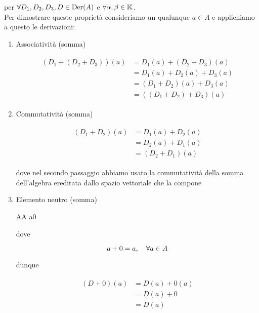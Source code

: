 per $ \forall D_{1}, D_{2}, D_{3}, D \in \operatorname{Der}(A) $ e $ \forall \alpha, \beta \in \mathbb{K} $.\\
Per dimostrare queste proprietà consideriamo un qualunque $ a \in A $ e applichiamo a questo le derivazioni:

\begin{enumerate}
	\item Associatività (somma)
	
	\begin{align}
		\begin{split}
			( D_{1} + (D_{2} + D_{3}) ) (a) &= D_{1} (a) + (D_{2} + D_{3}) (a)\\
			&= D_{1} (a) + D_{2} (a) + D_{3} (a)\\
			&= (D_{1} + D_{2}) (a) + D_{3} (a)\\
			&= ( (D_{1} + D_{2}) + D_{3} ) (a)
		\end{split}
	\end{align}
	
	\item Commutatività (somma)
	
	\begin{align}
		\begin{split}
			(D_{1} + D_{2}) (a) &= D_{1} (a) + D_{2} (a)\\
			&= D_{2} (a) + D_{1} (a)\\
			&= (D_{2} + D_{1}) (a)
		\end{split}
	\end{align}
	
	dove nel secondo passaggio abbiamo usato la commutatività della somma dell'algebra ereditata dallo spazio vettoriale che la compone
	
	\item Elemento neutro (somma)
	
		{A}{A}
		{a}{0}
	
	dove
	
	\begin{equation}
		a + 0 = a \qcomma \forall a \in A
	\end{equation}
	
	dunque
	
	\begin{align}
		\begin{split}
			(D + 0) (a) &= D (a) + 0 (a)\\
			&= D (a) + 0\\
			&= D (a)
		\end{split}
	\end{align}
	

\end{enumerate}
